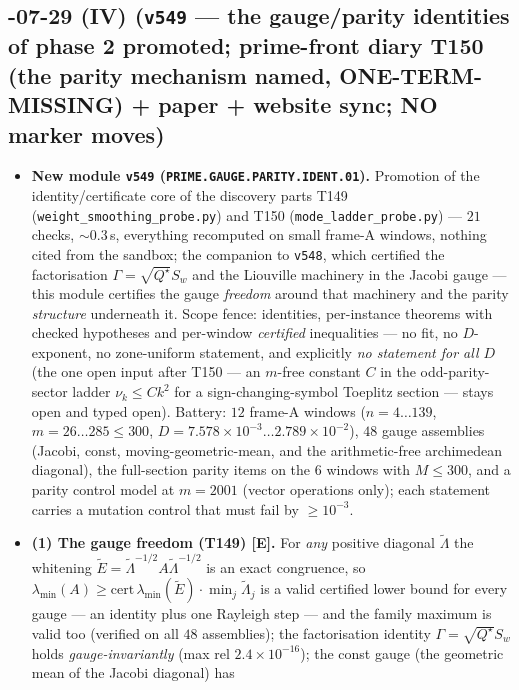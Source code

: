 \documentclass[11pt]{article}
\providecommand{\mE}{\textbf{[E]}}\providecommand{\mC}{\textbf{[C]}}
\begin{document}
\subsection*{-07-29 (IV) (\texttt{v549} --- the gauge/parity identities of phase 2 promoted; prime-front diary T150 (the parity mechanism named, ONE-TERM-MISSING) + paper + website sync; NO marker moves)}
\begin{itemize}[leftmargin=1.5em]
\item \textbf{New module \texttt{v549} (\texttt{PRIME.GAUGE.PARITY.IDENT.01}).} Promotion of the
identity/certificate core of the discovery parts T149 (\texttt{weight\_smoothing\_probe.py}) and
T150 (\texttt{mode\_ladder\_probe.py}) --- $21$ checks, ${\sim}0.3$\,s, everything recomputed on
small frame-A windows, nothing cited from the sandbox; the companion to \texttt{v548}, which
certified the factorisation $\Gamma=\sqrt{Q^\star}S_w$ and the Liouville machinery in the Jacobi
gauge --- this module certifies the gauge \emph{freedom} around that machinery and the parity
\emph{structure} underneath it. Scope fence: identities, per-instance theorems with checked
hypotheses and per-window \emph{certified} inequalities --- no fit, no $D$-exponent, no
zone-uniform statement, and explicitly \emph{no statement for all $D$} (the one open input after
T150 --- an $m$-free constant $C$ in the odd-parity-sector ladder $\nu_k\le Ck^2$ for a
sign-changing-symbol Toeplitz section --- stays open and typed open). Battery: $12$ frame-A
windows ($n=4\ldots139$, $m=26\ldots285\le300$,
$D=7.578\times10^{-3}\ldots2.789\times10^{-2}$), $48$ gauge assemblies (Jacobi, const,
moving-geometric-mean, and the arithmetic-free archimedean diagonal), the full-section parity
items on the $6$ windows with $M\le300$, and a parity control model at $m=2001$ (vector
operations only); each statement carries a mutation control that must fail by $\ge10^{-3}$.
\item \textbf{(1) The gauge freedom (T149) \mE.} For \emph{any} positive diagonal
$\tilde\Lambda$ the whitening $\tilde E=\tilde\Lambda^{-1/2}A\tilde\Lambda^{-1/2}$ is an exact
congruence, so $\lambda_{\min}(A)\ge\mathrm{cert}\,\lambda_{\min}(\tilde E)\cdot\min_j
\tilde\Lambda_j$ is a valid certified lower bound for every gauge --- an identity plus one
Rayleigh step --- and the family maximum is valid too (verified on all $48$ assemblies); the
factorisation identity $\Gamma=\sqrt{Q^\star}S_w$ holds \emph{gauge-invariantly} (max rel
$2.4\times10^{-16}$); the const gauge (the geometric mean of the Jacobi diagonal) has

\end{itemize}
\end{document}

